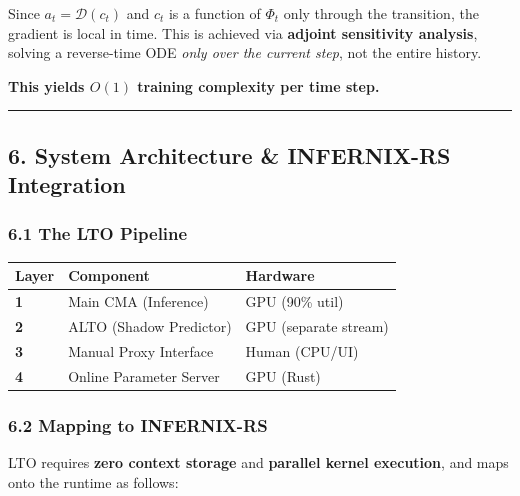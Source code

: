\documentclass[
  11pt,
  a4paper,
]{article}
\begin{document}
Since \(a_t = \mathcal{D}(c_t)\) and \(c_t\) is a function of \(\Phi_t\)
only through the transition, the gradient is local in time. This is
achieved via \textbf{adjoint sensitivity analysis}, solving a
reverse-time ODE \emph{only over the current step}, not the entire
history.

\textbf{This yields \(O(1)\) training complexity per time step.}

\begin{center}\rule{0.5\linewidth}{0.5pt}\end{center}

\subsection{6. System Architecture \& INFERNIX-RS
Integration}\label{system-architecture-infernix-rs-integration}

\subsubsection{6.1 The LTO Pipeline}\label{the-lto-pipeline}

\begin{longtable}[]{@{}lll@{}}
\toprule\noalign{}
Layer & Component & Hardware \\
\midrule\noalign{}
\endhead
\bottomrule\noalign{}
\endlastfoot
\textbf{1} & Main CMA (Inference) & GPU (90\% util) \\
\textbf{2} & ALTO (Shadow Predictor) & GPU (separate stream) \\
\textbf{3} & Manual Proxy Interface & Human (CPU/UI) \\
\textbf{4} & Online Parameter Server & GPU (Rust) \\
\end{longtable}

\subsubsection{6.2 Mapping to INFERNIX-RS}\label{mapping-to-infernix-rs}

LTO requires \textbf{zero context storage} and \textbf{parallel kernel
execution}, and maps onto the runtime as follows:
\end{document}
